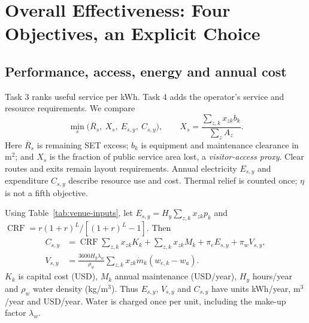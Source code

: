 \section[Cooling effectiveness]{Overall Effectiveness: Four Objectives, an Explicit Choice}
\label{sec:effectiveness}

\subsection{Performance, access, energy and annual cost}
Task 3 ranks useful service per kWh. Task 4 adds the operator's service and resource requirements. We compare
\begin{equation}
 \min_s\big(\overline R_s,\ X_s,\ E_{s,y},\ C_{s,y}\big),\qquad
 X_s=\frac{\sum_{z,k}x_{zk}b_k}{\sum_z A_z}.
\label{eq:effectiveness-vector}
\end{equation}
Here $\overline R_s$ is remaining SET excess; $b_k$ is equipment and maintenance clearance in m$^2$; and $X_s$ is the fraction of public service area lost, a \textit{visitor-access proxy}. Clear routes and exits remain layout requirements. Annual electricity $E_{s,y}$ and expenditure $C_{s,y}$ describe resource use and cost. Thermal relief is counted once; $\eta$ is not a fifth objective.

Using Table~\ref{tab:venue-inputs}, let $E_{s,y}=H_y\sum_{z,k}x_{zk}p_k$ and $\operatorname{CRF}=r(1+r)^L/[(1+r)^L-1]$. Then
\begin{equation}
 \begin{aligned}
 C_{s,y}&=\operatorname{CRF}\sum_{z,k}x_{zk}K_k+
             \sum_{z,k}x_{zk}M_k+\pi_eE_{s,y}+\pi_wV_{s,y},\\
 V_{s,y}&=\frac{3600H_y\lambda_w}{\rho_w}
          \sum_{z,k}x_{zk}\dot m_k(w_{e,k}-w_a).
 \end{aligned}
\label{eq:venue-cost}
\end{equation}
$K_k$ is capital cost (USD), $M_k$ annual maintenance (USD/year), $H_y$ hours/year and $\rho_w$ water density (kg/m$^3$). Thus $E_{s,y}$, $V_{s,y}$ and $C_{s,y}$ have units kWh/year, m$^3$/year and USD/year. Water is charged once per unit, including the make-up factor $\lambda_w$.


